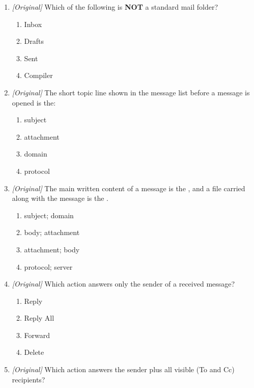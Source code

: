 \begin{enumerate}[label=\textbf{Q\arabic*.}, leftmargin=*]
  \begin{enumerate}[label=\Alph*.]
    \item Trash (deleted items) folder
    \item Drafts folder
    \item Inbox folder
    \item Sent folder
  \end{enumerate}
\item \textit{[Original]} Which of the following is \textbf{NOT} a standard mail folder?
  \begin{enumerate}[label=\Alph*.]
    \item Inbox
    \item Drafts
    \item Sent
    \item Compiler
  \end{enumerate}
\item \textit{[Original]} The short topic line shown in the message list before a message is opened is the:
  \begin{enumerate}[label=\Alph*.]
    \item subject
    \item attachment
    \item domain
    \item protocol
  \end{enumerate}
\item \textit{[Original]} The main written content of a message is the \underline{\hspace{2.2cm}}, and a file carried along with the message is the \underline{\hspace{2.2cm}}.
  \begin{enumerate}[label=\Alph*.]
    \item subject; domain
    \item body; attachment
    \item attachment; body
    \item protocol; server
  \end{enumerate}
\item \textit{[Original]} Which action answers only the sender of a received message?
  \begin{enumerate}[label=\Alph*.]
    \item Reply
    \item Reply All
    \item Forward
    \item Delete
  \end{enumerate}
\item \textit{[Original]} Which action answers the sender plus all visible (To and Cc) recipients?

\end{enumerate}
